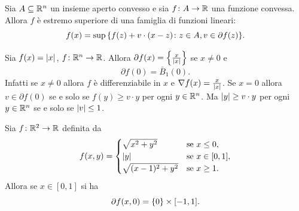   \begin{corollary}
  Sia $A\subseteq {\mathbb R}^n$ un insieme aperto convesso e sia $f\colon A \to {\mathbb R}$ una funzione convessa.
  Allora $f$ è estremo superiore di una famiglia di funzioni 
  lineari: 
  \[
   f(x) = \sup {\left\{ f(z) + v\cdot (x-z) \colon z\in A, v\in \partial f(z) \right\}}.
  \]
  \end{corollary}

  \begin{example}
  Sia $f(x) = {\left|x\right|}$, $f\colon {\mathbb R}^n \to {\mathbb R}$. 
  Allora $\partial f(x) = {\left\{ \frac{x}{{\left|x\right|}} \right\}}$ se $x\neq 0$ e
  \[
    \partial f(0) = \bar B_1(0).
  \]
  Infatti se $x\neq 0$ allora $f$ è differenziabile in $x$ e $\nabla f(x) = \frac{x}{{\left|x\right|}}$.
  Se $x=0$ allora $v\in \partial f(0)$ se e solo se $f(y) \ge v\cdot y$ per ogni $y\in {\mathbb R}^n$.
  Ma ${\left|y\right|} \ge v\cdot y$ per ogni $y\in {\mathbb R}^n$ se e solo se ${\left|v\right|}\le 1$.
  \end{example}
  \begin{example}[stadio]
  Sia $f\colon {\mathbb R}^2\to {\mathbb R}$ definita da 
  \[
    f(x,y) = \begin{cases}
     \sqrt{x^2+y^2} & \text{se } x\le 0, \\
     {\left|y\right|} & \text{se } x\in [0,1], \\
      \sqrt{(x-1)^2+y^2} & \text{se } x\ge 1.
    \end{cases}
  \]
  Allora se $x\in [0,1]$ si ha 
  \[
    \partial f (x,0) = {\left\{ 0 \right\}} \times [-1,1].
  \]
  \end{example}